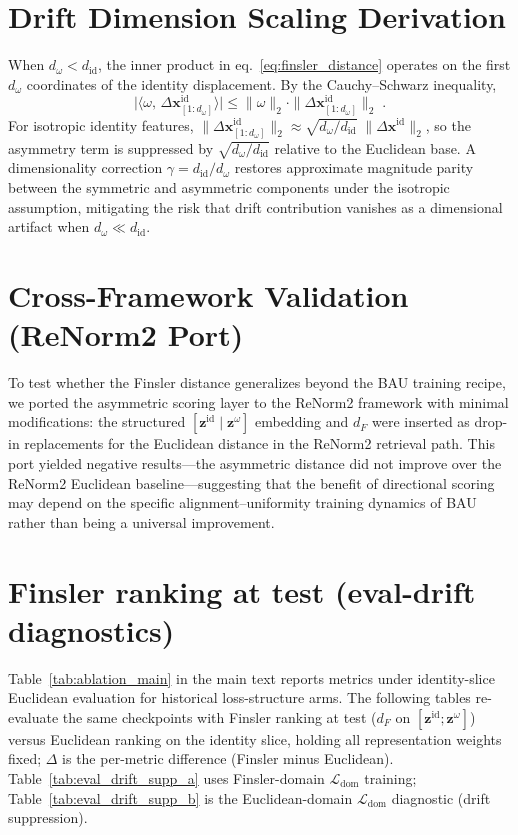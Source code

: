 \section{Drift Dimension Scaling Derivation} \label{sec:suppl_drift_dim_scaling}
When $d_\omega < d_{\mathrm{id}}$, the inner product in eq.~\eqref{eq:finsler_distance} operates on the first $d_\omega$ coordinates of the identity displacement. By the Cauchy--Schwarz inequality,
\begin{equation}
    \bigl|\langle \omega,\, \Delta \mathbf{x}^{\mathrm{id}}_{[1:d_\omega]} \rangle\bigr| \leq \|\omega\|_2 \cdot \|\Delta \mathbf{x}^{\mathrm{id}}_{[1:d_\omega]}\|_2 \;.
    \label{eq:cauchy_schwarz_bound}
\end{equation}
For isotropic identity features, $\|\Delta \mathbf{x}^{\mathrm{id}}_{[1:d_\omega]}\|_2 \approx \sqrt{d_\omega / d_{\mathrm{id}}}\;\|\Delta \mathbf{x}^{\mathrm{id}}\|_2$, so the asymmetry term is suppressed by $\sqrt{d_\omega / d_{\mathrm{id}}}$ relative to the Euclidean base. A dimensionality correction $\gamma = d_{\mathrm{id}} / d_\omega$ restores approximate magnitude parity between the symmetric and asymmetric components under the isotropic assumption, mitigating the risk that drift contribution vanishes as a dimensional artifact when $d_\omega \ll d_{\mathrm{id}}$.

\section{Cross-Framework Validation (ReNorm2 Port)} \label{sec:suppl_renorm2}
To test whether the Finsler distance generalizes beyond the BAU training recipe, we ported the asymmetric scoring layer to the ReNorm2 framework with minimal modifications: the structured $[\mathbf{z}^{\mathrm{id}} \mid \mathbf{z}^{\omega}]$ embedding and $d_F$ were inserted as drop-in replacements for the Euclidean distance in the ReNorm2 retrieval path. This port yielded negative results---the asymmetric distance did not improve over the ReNorm2 Euclidean baseline---suggesting that the benefit of directional scoring may depend on the specific alignment--uniformity training dynamics of BAU rather than being a universal improvement.

\section{Finsler ranking at test (eval-drift diagnostics)} \label{sec:suppl_eval_drift_tables}
Table~\ref{tab:ablation_main} in the main text reports metrics under identity-slice Euclidean evaluation for historical loss-structure arms. The following tables re-evaluate the same checkpoints with Finsler ranking at test ($d_F$ on $[\mathbf{z}^{\mathrm{id}};\mathbf{z}^{\omega}]$) versus Euclidean ranking on the identity slice, holding all representation weights fixed; $\Delta$ is the per-metric difference (Finsler minus Euclidean). Table~\ref{tab:eval_drift_supp_a} uses Finsler-domain $\mathcal{L}_{\mathrm{dom}}$ training; Table~\ref{tab:eval_drift_supp_b} is the Euclidean-domain $\mathcal{L}_{\mathrm{dom}}$ diagnostic (drift suppression).


